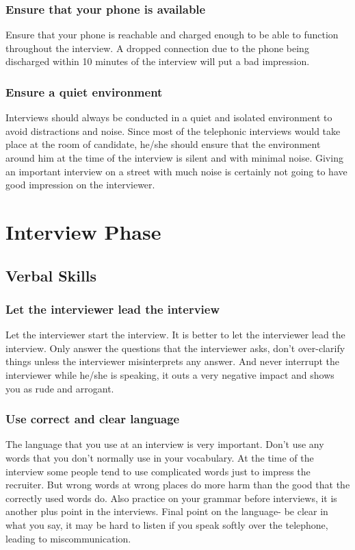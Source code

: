 \documentclass[a4paper,12pt]{report}
\begin{document}
\subsubsection{Ensure that your phone is available}
Ensure that your phone is reachable and charged enough to be able to function throughout the interview. A dropped
connection due to the phone being discharged within 10 minutes of the interview will put a bad impression.
\subsubsection{Ensure a quiet environment}
Interviews should always be conducted in a quiet and isolated environment to avoid distractions and noise.
Since most of the telephonic interviews would take place at the room of candidate, he/she should ensure that the environment 
around him at the time of the interview is silent and with minimal noise. Giving an important interview on a 
street with much noise is certainly not going to have good impression on the interviewer.

\section{Interview Phase}
\subsection{Verbal Skills}
\subsubsection{Let the interviewer lead the interview}
Let the interviewer start the interview. It is better to let the interviewer lead the interview. Only answer 
the questions that the interviewer asks, don't over-clarify things unless the interviewer misinterprets any
answer. And never interrupt the interviewer while he/she is speaking, it outs a very negative impact and shows 
you as rude and arrogant.
\subsubsection{Use correct and clear language}
The language that you use at an interview is very important.
Don't use any words that you don't normally use in your vocabulary. At the time of the interview some people
tend to use complicated words just to impress the recruiter. But wrong words at wrong places do more harm than
 the good that the correctly used words do. Also practice on your grammar before interviews, it is another
plus point in the interviews. Final point on the language- be clear in what you say, it may be hard to listen
if you speak softly over the telephone, leading to miscommunication.
\end{document}
